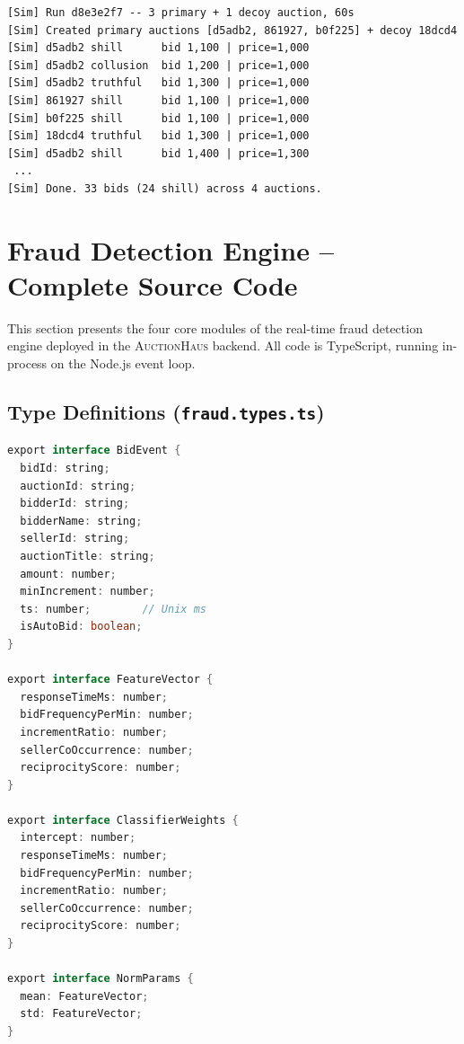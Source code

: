 \documentclass[11pt]{article}
\begin{document}
\begin{lstlisting}[language={},caption={Actual simulator console output (abbreviated).}]
[Sim] Run d8e3e2f7 -- 3 primary + 1 decoy auction, 60s
[Sim] Created primary auctions [d5adb2, 861927, b0f225] + decoy 18dcd4
[Sim] d5adb2 shill      bid 1,100 | price=1,000
[Sim] d5adb2 collusion  bid 1,200 | price=1,000
[Sim] d5adb2 truthful   bid 1,300 | price=1,000
[Sim] 861927 shill      bid 1,100 | price=1,000
[Sim] b0f225 shill      bid 1,100 | price=1,000
[Sim] 18dcd4 truthful   bid 1,300 | price=1,000
[Sim] d5adb2 shill      bid 1,400 | price=1,300
 ...
[Sim] Done. 33 bids (24 shill) across 4 auctions.
\end{lstlisting}

\section{Fraud Detection Engine -- Complete Source Code}
\label{sec:source}

This section presents the four core modules of the real-time fraud
detection engine deployed in the \textsc{AuctionHaus} backend. All code
is TypeScript, running in-process on the Node.js event loop.

\subsection{Type Definitions (\texttt{fraud.types.ts})}

\begin{lstlisting}[language=Java,caption={Core type interfaces for the fraud engine.}]
export interface BidEvent {
  bidId: string;
  auctionId: string;
  bidderId: string;
  bidderName: string;
  sellerId: string;
  auctionTitle: string;
  amount: number;
  minIncrement: number;
  ts: number;        // Unix ms
  isAutoBid: boolean;
}

export interface FeatureVector {
  responseTimeMs: number;
  bidFrequencyPerMin: number;
  incrementRatio: number;
  sellerCoOccurrence: number;
  reciprocityScore: number;
}

export interface ClassifierWeights {
  intercept: number;
  responseTimeMs: number;
  bidFrequencyPerMin: number;
  incrementRatio: number;
  sellerCoOccurrence: number;
  reciprocityScore: number;
}

export interface NormParams {
  mean: FeatureVector;
  std: FeatureVector;
}
\end{lstlisting}
\end{document}
